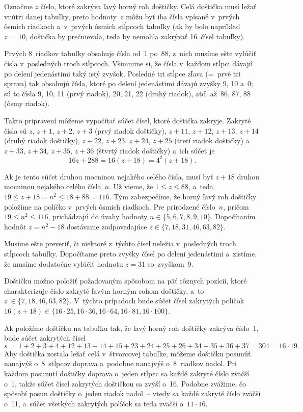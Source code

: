{%
Označme $z$ číslo, ktoré zakrýva ľavý horný roh doštičky. Celá
doštička musí ležať vnútri danej tabuľky, preto hodnoty~$z$ môžu byť
iba čísla vpísané v~prvých ôsmich riadkoch a~v~prvých ôsmich
stĺpcoch tabuľky (ak by bolo napríklad $z~= 10$, doštička by
prečnievala, teda by nemohla zakrývať 16~čísel tabuľky).

Prvých 8~riadkov tabuľky obsahuje čísla od~1
po~88, z~nich musíme ešte vylúčiť čísla v~posledných troch stĺpcoch.
Všimnime si, že čísla v~každom stĺpci dávajú po delení jedenástimi
taký istý zvyšok.
Posledné tri stĺpce zľava (=~prvé tri sprava) tak obsahujú čísla,
ktoré po delení jedenástimi dávajú zvyšky 9, 10 a~0;
sú to čísla 9, 10, 11 (prvý riadok), 20, 21, 22 (druhý riadok), atď.
až~86, 87, 88 (ôsmy riadok).

Takto pripravení môžeme vypočítať súčet čísel, ktoré doštička zakryje.
Zakryté čísla sú $z$, $z+1$, $z+2$, $z+3$ (prvý riadok doštičky),
$z+11$, $ z+12$, $ z+13$, $ z+14$ (druhý riadok doštičky), $z+22$, $ z+23$, $ z+24$,
$z+25$ (tretí riadok doštičky) a~$z+33$, $ z+34$, $ z+35$, $ z+36$ (štvrtý riadok
doštičky) a~ich súčet je
$$16z+288 = 16 (z+18) = 4^2(z+18).$$

Ak je tento súčet druhou
mocninou nejakého celého čísla, musí byť $z+18$ druhou mocninou
nejakého celého čísla~$n$. Už vieme, že $1\le z\le88$, a~teda $19\le
z+18 = n^2\le18+88 = 116$. Tým zabezpečíme, že horný ľavý roh doštičky
položíme na políčko v~prvých ôsmich riadkoch. Pre prirodzené číslo~$n$, pričom
$19\le n^2\le116$, prichádzajú do úvahy hodnoty $n \in\{5, 6, 7, 8, 9, 10\}$.
Dopočítaním hodnôt $z= n^2-18$ dostávame zodpovedajúce $z\in\{7, 18, 31, 46, 63, 82\}$.

Musíme ešte preveriť, či niektoré z~týchto čísel
neležia v~posledných troch stĺpcoch tabuľky. Dopočítame preto zvyšky čísel po
delení jedenástimi a~zistíme, že musíme dodatočne vylúčiť hodnotu $z= 31$
so~zvyškom~9.

Doštičku možno položiť požadovaným spôsobom na
päť rôznych pozícií, ktoré charakterizuje číslo zakryté ľavým horným
rohom doštičky, a~to $z~\in \{7, 18, 46, 63, 82\}$. V~týchto prípadoch bude
súčet čísel zakrytých políčok $16 (z+18) \in \{16 \cdot 25, 16 \cdot 36,
16 \cdot 64,\allowbreak 16 \cdot 81, 16 \cdot 100\}$.

\ineriesenie
Ak položíme doštičku na tabuľku tak, že ľavý horný roh doštičky zakrýva
číslo~1, bude súčet zakrytých čísel
$$
s~= 1+2+3+4+12+13+14+15+23+24+25+26+34+35+36+37 = 304 = 16 \cdot 19.
$$
Aby doštička zostala ležať celá v~štvorcovej tabuľke, môžeme doštičku posunúť
nanajvýš o~8~stĺpcov doprava a~podobne nanajvýš o~8~riadkov nadol. Pri
každom posunutí doštičky doprava o~jeden stĺpec sa každé zakryté číslo
zväčší o~1, takže súčet čísel zakrytých doštičkou sa zvýší o~16.
Podobne zvážime, čo spôsobí posun doštičky o~jeden riadok
nadol~-- vtedy sa každé zakryté číslo zväčší o~11, a~súčet všetkých
zakrytých políčok sa teda zväčší o~$11 \cdot 16$.

}
